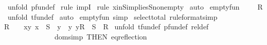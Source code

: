 \begin{isabellebody}
%
\isadelimproof
%
\endisadelimproof
%
\isatagproof
{}\isamarkupfalse%
\ {\isacharparenleft}unfold\ pfun{\isacharunderscore}def{\isacharparenright}\isanewline
{}\isamarkupfalse%
\ {\isacharparenleft}rule\ impI{\isacharparenright}\isanewline
{}\isamarkupfalse%
\ {\isacharparenleft}rule\ x{\isacharunderscore}in{\isacharunderscore}S{\isacharunderscore}implies{\isacharunderscore}S{\isacharunderscore}nonempty{\isacharparenright}\isanewline
{}\isamarkupfalse%
\ auto\isanewline
{}\isamarkupfalse%
%
\endisatagproof
{\isafoldproof}%
%
\isadelimproof
%
\endisadelimproof
%
\isamarkuptrue%
\isamarkupfalse%
\ empty{\isacharunderscore}fun{\isacharcolon}\ {\isachardoublequoteopen}{\isacharbraceleft}{\isacharbraceright}\ {\isacharcolon}\ {\isacharparenleft}{\isacharbraceleft}{\isacharbraceright}\ {\isacharminus}{\isacharminus}{\isacharminus}{\isachargreater}\ R{\isacharparenright}{\isachardoublequoteclose}\isanewline
%
\isadelimproof
%
\endisadelimproof
%
\isatagproof
{}\isamarkupfalse%
\ {\isacharparenleft}unfold\ tfun{\isacharunderscore}def{\isacharparenright}\isanewline
{}\isamarkupfalse%
\ auto\isanewline
{}\isamarkupfalse%
%
\endisatagproof
{\isafoldproof}%
%
\isadelimproof
\isanewline
%
\endisadelimproof
{}\isamarkupfalse%
\ empty{\isacharunderscore}fun\ {\isacharbrackleft}simp{\isacharbrackright}\isanewline
\isanewline
\isanewline
{}\isamarkupfalse%
\ select{\isacharunderscore}total\ {\isacharbrackleft}rule{\isacharunderscore}format{\isacharcomma}simp{\isacharbrackright}{\isacharcolon}\ \isanewline
{\isachardoublequoteopen}R\ {\isachartilde}{\isacharequal}\ {\isacharbraceleft}{\isacharbraceright}\ {\isacharminus}{\isacharminus}{\isachargreater}\ {\isacharbraceleft}{\isacharparenleft}x{\isacharcomma}y{\isacharparenright}{\isachardot}\ x\ {\isacharcolon}\ S\ {\isacharampersand}\ y\ {\isacharequal}\ {\isacharparenleft}{\isacharat}y{\isachardot}\ y{\isacharcolon}R{\isacharparenright}{\isacharbraceright}\ {\isacharcolon}\ {\isacharparenleft}S\ {\isacharminus}{\isacharminus}{\isacharminus}{\isachargreater}\ R{\isacharparenright}{\isachardoublequoteclose}\isanewline
%
\isadelimproof
%
\endisadelimproof
%
\isatagproof
{}\isamarkupfalse%
\ {\isacharparenleft}unfold\ tfun{\isacharunderscore}def\ pfun{\isacharunderscore}def\ rel{\isacharunderscore}def\ \isanewline
\ \ \ \ \ \ \ \ \ \ \ \ \ \ dom{\isacharunderscore}simp\ {\isacharbrackleft}THEN\ eq{\isacharunderscore}reflection{\isacharbrackright}{\isacharparenright}\isanewline

\end{isabellebody}
